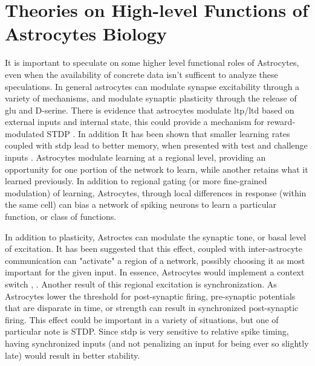     
    \section{Theories on High-level Functions of Astrocytes Biology}
    
    It is important to speculate on some higher level functional roles of
    Astrocytes, even when the availability of concrete data isn't sufficent to
    analyze these speculations. In general astrocytes can modulate synapse
    excitability through a variety of mechanisms, and modulate synaptic
    plasticity through the release of \Gls{glu} and D-serine. There is evidence
    that astrocytes modulate \Gls{ltp}/\Gls{ltd} based on external inputs and internal
    state, this could provide a mechanism for reward-modulated STDP
    \cite{min_2012}. In addition It has been shown that smaller learning rates
    coupled with \Gls{stdp} lead to better memory, when presented with test and
    challenge inputs \cite{van-rossum_2012}. Astrocytes modulate learning at a
    regional level, providing an opportunity for one portion of the network to
    learn, while another retains what it learned previously. In addition to
    regional gating (or more fine-grained modulation) of learning, Astrocytes,
    through local differences in response (within the same cell) can bias a
    network of spiking neurons to learn a particular function, or class of
    functions.

    In addition to plasticity, Astroctes can modulate the synaptic tone, or
    basal level of excitation. It has been suggested that this effect, coupled
    with inter-astrocyte communication can "activate" a region of a network,
    possibly choosing it as most important for the given input. In essence,
    Astrocytes would implement a context switch \cite{min_2012},
    \cite{gordleeva_2021}. Another result of this regional excitation is
    synchronization. As Astrocytes lower the threshold for post-synaptic firing,
    pre-synaptic potentials that are disparate in time, or strength can result
    in synchronized post-synaptic firing. This effect could be important in a
    variety of situations, but one of particular note is STDP. Since \Gls{stdp} is
    very sensitive to relative spike timing, having synchronized inputs (and not
    penalizing an input for being ever so slightly late) would result in better
    stability.

